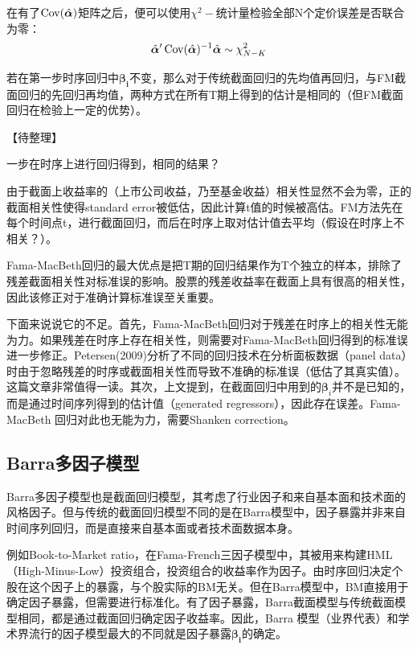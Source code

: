 \documentclass[11pt]{article}
\begin{document}
在有了$\operatorname{Cov}(\hat{\bm{\alpha}})$矩阵之后，便可以使用$\chi^2-$统计量检验全部N个定价误差是否联合为零：
\begin{equation*}
    \hat{\bm{\alpha}}' \operatorname{Cov}(\hat{\bm{\alpha}})^{-1} \hat{\bm{\alpha}} \sim \chi_{N-K}^{2}
\end{equation*}

若在第一步时序回归中$\bm{\beta_i}$不变，那么对于传统截面回归的先均值再回归，与FM截面回归的先回归再均值，两种方式在所有T期上得到的估计是相同的（但FM截面回归在检验上一定的优势）。

【待整理】

一步在时序上进行回归得到，相同的结果？

由于截面上收益率的（上市公司收益，乃至基金收益）相关性显然不会为零，正的截面相关性使得standard error被低估，因此计算t值的时候被高估。FM方法先在每个时间点t，进行截面回归，而后在时序上取对估计值去平均（假设在时序上不相关？）。

Fama-MacBeth回归的最大优点是把T期的回归结果作为T个独立的样本，排除了残差截面相关性对标准误的影响。股票的残差收益率在截面上具有很高的相关性，因此该修正对于准确计算标准误至关重要。

下面来说说它的不足。首先，Fama-MacBeth回归对于残差在时序上的相关性无能为力。如果残差在时序上存在相关性，则需要对Fama-MacBeth回归得到的标准误进一步修正。Petersen(2009)分析了不同的回归技术在分析面板数据（panel data）时由于忽略残差的时序或截面相关性而导致不准确的标准误（低估了其真实值）。这篇文章非常值得一读。其次，上文提到，在截面回归中用到的$\bm{\beta}_i$并不是已知的，而是通过时间序列得到的估计值（generated regressors），因此存在误差。Fama-MacBeth 回归对此也无能为力，需要Shanken correction。

\subsection{Barra多因子模型}

Barra多因子模型也是截面回归模型，其考虑了行业因子和来自基本面和技术面的风格因子。但与传统的截面回归模型不同的是在Barra模型中，因子暴露并非来自时间序列回归，而是直接来自基本面或者技术面数据本身。

例如Book-to-Market ratio，在Fama-French三因子模型中，其被用来构建HML（High-Minus-Low）投资组合，投资组合的收益率作为因子。由时序回归决定个股在这个因子上的暴露，与个股实际的BM无关。但在Barra模型中，BM直接用于确定因子暴露，但需要进行标准化。有了因子暴露，Barra截面模型与传统截面模型相同，都是通过截面回归确定因子收益率。因此，Barra 模型（业界代表）和学术界流行的因子模型最大的不同就是因子暴露$\bm{\beta_i}$的确定。
\end{document}
